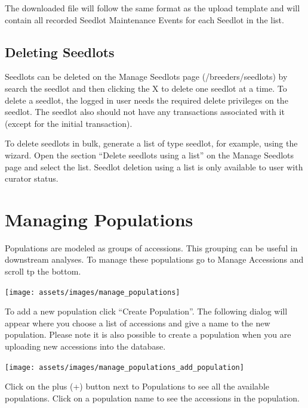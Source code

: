 \documentclass[
  12pt,
]{book}
\begin{document}
The downloaded file will follow the same format as the upload template and will contain all recorded Seedlot Maintenance Events for each Seedlot in the list.

\hypertarget{deleting-seedlots}{%
\section{Deleting Seedlots}\label{deleting-seedlots}}

Seedlots can be deleted on the Manage Seedlots page (/breeders/seedlots) by search the seedlot and then clicking the X to delete one seedlot at a time. To delete a seedlot, the logged in user needs the required delete privileges on the seedlot. The seedlot also should not have any transactions associated with it (except for the initial transaction).

To delete seedlots in bulk, generate a list of type seedlot, for example, using the wizard. Open the section ``Delete seedlots using a list'' on the Manage Seedlots page and select the list. Seedlot deletion using a list is only available to user with curator status.

\hypertarget{managing-populations}{%
\chapter{Managing Populations}\label{managing-populations}}

Populations are modeled as groups of accessions. This grouping can be useful in downstream analyses. To manage these populations go to Manage Accessions and scroll tp the bottom.

\begin{center}\texttt{[image: assets/images/manage\_populations]} \end{center}

To add a new population click ``Create Population''. The following dialog will appear where you choose a list of accessions and give a name to the new population. Please note it is also possible to create a population when you are uploading new accessions into the database.

\begin{center}\texttt{[image: assets/images/manage\_populations\_add\_population]} \end{center}

Click on the plus (+) button next to Populations to see all the available populations. Click on a population name to see the accessions in the population.
\end{document}

